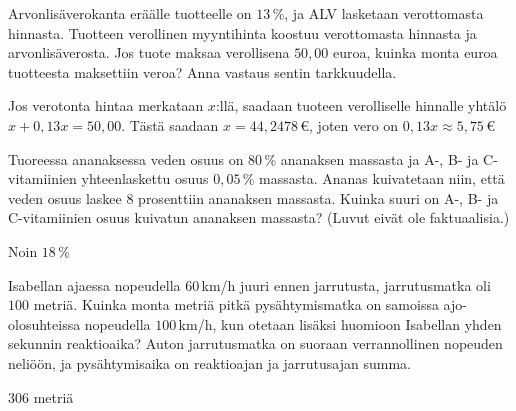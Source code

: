 \begin{multicols}{2}
\begin{tehtava}
Arvonlisäverokanta eräälle tuotteelle on $13$\,\%, ja ALV lasketaan verottomasta hinnasta. Tuotteen verollinen myyntihinta koostuu verottomasta hinnasta ja arvonlisäverosta. Jos tuote maksaa verollisena $50,00$ euroa, kuinka monta euroa tuotteesta maksettiin veroa? Anna vastaus sentin tarkkuudella.
	\begin{vastaus}
	Jos verotonta hintaa merkataan $x$:llä, saadaan tuoteen verolliselle hinnalle yhtälö $x+0,13x=50,00$. Tästä saadaan $x=44,2478$\,€, joten vero on $0,13x\approx 5,75$\,€
	\end{vastaus}
\end{tehtava}
	
\begin{tehtava}
	\begin{vastaus}
	\end{vastaus}
\end{tehtava}
	
\begin{tehtava}
Tuoreessa ananaksessa veden osuus on $80$\,\% ananaksen massasta ja A-, B- ja C-vitamiinien yhteenlaskettu osuus $0,05$\,\% massasta. Ananas kuivatetaan niin, että veden osuus laskee $8$ prosenttiin ananaksen massasta. Kuinka suuri on A-, B- ja C-vitamiinien osuus kuivatun ananaksen massasta? (Luvut eivät ole faktuaalisia.)
	\begin{vastaus}
	 Noin $18$\,\%
	\end{vastaus}
\end{tehtava}
	
\begin{tehtava}
Isabellan ajaessa nopeudella $60$\,km/h juuri ennen jarrutusta, jarrutusmatka oli $100$ metriä. Kuinka monta metriä pitkä pysähtymismatka on samoissa ajo-olosuhteissa nopeudella $100$\,km/h, kun otetaan lisäksi huomioon Isabellan yhden sekunnin reaktioaika? Auton jarrutusmatka on suoraan verrannollinen nopeuden neliöön, ja pysähtymisaika on reaktioajan ja jarrutusajan summa.
	\begin{vastaus}
$306$ metriä
	\end{vastaus}
\end{tehtava}
	

\end{multicols}
